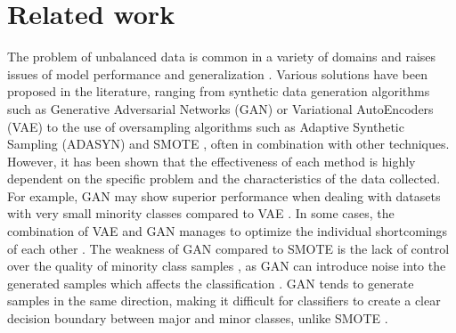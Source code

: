 \documentclass[12pt]{book}
\begin{document}
\section{Related work} \label{sec:related_work}

The problem of unbalanced data is common in a variety of domains \citep{wang2023machine,gupta2023unbalanced,anggrawan2023improving} and raises issues of model performance and generalization \citep{wang2021review}. Various solutions have been proposed in the literature, ranging from synthetic data generation algorithms such as Generative Adversarial Networks (GAN) \citep{ahsan2023bsgan,zhou2020deep} or Variational AutoEncoders (VAE) \citep{chuang2023b,tian2023unbalanced} to the use of oversampling algorithms such as Adaptive Synthetic Sampling (ADASYN) \citep{el2023improving,guan2023transformer} and SMOTE \citep{liang2020lr,dablain2022deepsmote}, often in combination with other techniques. However, it has been shown that the effectiveness of each method is highly dependent on the specific problem and the characteristics of the data collected. For example, GAN may show superior performance when dealing with datasets with very small minority classes compared to VAE \citep{kiran2023comparative}. In some cases, the combination of VAE and GAN \citep{wang2022two} manages to optimize the individual shortcomings of each other \citep{bao2022variational}. The weakness of GAN compared to SMOTE is the lack of control over the quality of minority class samples \citep{sharma2022smotified}, as GAN can introduce noise into the generated samples which affects the classification \citep{bao2023two}. GAN tends to generate samples in the same direction, making it difficult for classifiers to create a clear decision boundary between major and minor classes, unlike SMOTE \citep{ahsan2023bsgan}.

\end{document}
